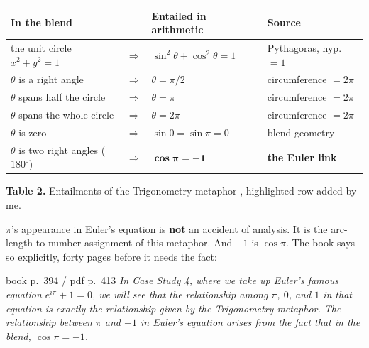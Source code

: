 \begin{center}\small
\begin{tabular}{@{}>{\raggedright\arraybackslash}p{6.15cm} c >{\raggedright\arraybackslash}p{4.7cm} >{\raggedleft\arraybackslash}p{4.1cm}@{}}
\toprule
\rowcolor{csA!12}
\textbf{\color{csA}In the blend} & & \textbf{\color{csA}Entailed in arithmetic} & \textbf{\color{csA}Source}\\
\midrule
the unit circle $x^2+y^2=1$              & $\Rightarrow$ & $\sin^2\theta+\cos^2\theta=1$ & Pythagoras, hyp.\ $=1$\\
$\theta$ is a right angle                & $\Rightarrow$ & $\theta=\pi/2$                & circumference $=2\pi$\\
$\theta$ spans half the circle           & $\Rightarrow$ & $\theta=\pi$                  & circumference $=2\pi$\\
$\theta$ spans the whole circle          & $\Rightarrow$ & $\theta=2\pi$                 & circumference $=2\pi$\\
$\theta$ is zero                         & $\Rightarrow$ & $\sin 0=\sin\pi=0$            & blend geometry\\
\rowcolor{gold!22}
$\theta$ is two right angles ($180^\circ$)& $\Rightarrow$ & $\boldsymbol{\cos\pi=-1}$    & \textbf{the Euler link}\\
\bottomrule
\end{tabular}
\end{center}
\vspace{-2pt}
\begin{center}\begin{minipage}{0.93\textwidth}\footnotesize\color{slate}
\textbf{Table 2.}\; Entailments of the Trigonometry metaphor , highlighted row added by me.
\end{minipage}\end{center}

\begin{ideabox}[title={The payoff you must not skim past}]
$\pi$'s appearance in Euler's equation is \textbf{not} an accident of analysis. It is the
arc-length-to-number assignment of this metaphor. And $-1$ is $\cos\pi$. The book says so explicitly,
forty pages before it needs the fact:
\begin{bookquote}{book p.~394 / pdf p.~413}
\textit{In Case Study 4, where we take up Euler's famous equation $e^{i\pi}+1=0$, we will see that
the relationship among $\pi$, $0$, and $1$ in that equation is exactly the relationship given by the
Trigonometry metaphor. The relationship between $\pi$ and $-1$ in Euler's equation arises from the
fact that in the blend, $\cos\pi=-1$.}
\end{bookquote}
\end{ideabox}

